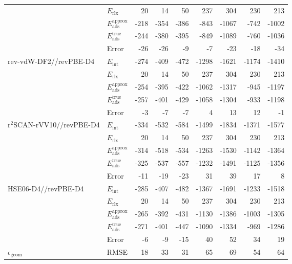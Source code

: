 \begin{table}
\begin{adjustbox}{center,max width=0.85\textwidth}
\begin{tabular}{llrrrrrrr}
 & $E_\textrm{rlx}$ & 20 & 14 & 50 & 237 & 304 & 230 & 213 \\
 & $E_\textrm{ads}^\textrm{approx}$ & -218 & -354 & -386 & -843 & -1067 & -742 & -1002 \\
 & $E_\textrm{ads}^\textrm{true}$ & -244 & -380 & -395 & -849 & -1089 & -760 & -1036 \\
 & Error & -26 & -26 & -9 & -7 & -23 & -18 & -34 \\
\cline{1-9}
\multirow[t]{5}{*}{rev-vdW-DF2//revPBE-D4} & $E_\textrm{int}$ & -274 & -409 & -472 & -1298 & -1621 & -1174 & -1410 \\
 & $E_\textrm{rlx}$ & 20 & 14 & 50 & 237 & 304 & 230 & 213 \\
 & $E_\textrm{ads}^\textrm{approx}$ & -254 & -395 & -422 & -1062 & -1317 & -945 & -1197 \\
 & $E_\textrm{ads}^\textrm{true}$ & -257 & -401 & -429 & -1058 & -1304 & -933 & -1198 \\
 & Error & -3 & -7 & -7 & 4 & 13 & 12 & -1 \\
\cline{1-9}
\multirow[t]{5}{*}{r$^2$SCAN-rVV10//revPBE-D4} & $E_\textrm{int}$ & -334 & -532 & -584 & -1499 & -1834 & -1371 & -1577 \\
 & $E_\textrm{rlx}$ & 20 & 14 & 50 & 237 & 304 & 230 & 213 \\
 & $E_\textrm{ads}^\textrm{approx}$ & -314 & -518 & -534 & -1263 & -1530 & -1142 & -1364 \\
 & $E_\textrm{ads}^\textrm{true}$ & -325 & -537 & -557 & -1232 & -1491 & -1125 & -1356 \\
 & Error & -11 & -19 & -23 & 31 & 39 & 17 & 8 \\
\cline{1-9}
\multirow[t]{5}{*}{HSE06-D4//revPBE-D4} & $E_\textrm{int}$ & -285 & -407 & -482 & -1367 & -1691 & -1233 & -1518 \\
 & $E_\textrm{rlx}$ & 20 & 14 & 50 & 237 & 304 & 230 & 213 \\
 & $E_\textrm{ads}^\textrm{approx}$ & -265 & -392 & -431 & -1130 & -1386 & -1003 & -1305 \\
 & $E_\textrm{ads}^\textrm{true}$ & -271 & -401 & -447 & -1090 & -1334 & -969 & -1286 \\
 & Error & -6 & -9 & -15 & 40 & 52 & 34 & 19 \\
\cline{1-9}
$\epsilon_\textrm{geom}$ & RMSE & 18 & 33 & 31 & 65 & 69 & 54 & 64 \\
\cline{1-9}
\bottomrule
\end{tabular}
\end{adjustbox}
\end{table}
